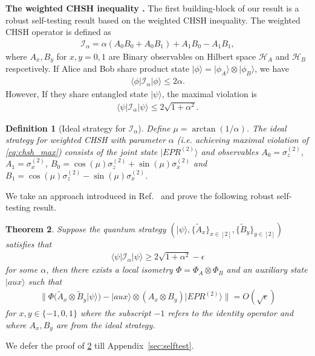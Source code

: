 \documentclass[11pt,letterpaper]{article}
\newcommand{\ket}[1]{|#1\rangle}
\newcommand{\bra}[1]{\langle#1|}
\newcommand{\x}{\otimes}
\newcommand{\calH}{\mathcal{H}}
\newcommand{\1}{\mathbb{1}}
\newcommand{\EPR}[1]{EPR^{(#1)}}
\newcommand{\paulix}[1]{\sigma_x^{(#1)}}
\newcommand{\pauliz}[1]{\sigma_z^{(#1)}}
\newcommand{\I}{\mathcal{I}}
\newtheorem{theorem}{Theorem}
\newtheorem{definition}[theorem]{Definition}
\theoremstyle{definition}
\begin{document}
\textbf{The weighted CHSH inequality \cite{acin2012}.}
The first building-block of our result is a robust self-testing result based on the weighted CHSH inequality.
The weighted CHSH operator is defined as 
\begin{align}
	\label{eq:chsh_op}
	\I_\alpha = \alpha(A_0B_0+A_0B_1) + A_1B_0 - A_1B_1,
\end{align}
where $A_x,B_y$ for $x,y = 0,1$ are Binary observables on Hilbert space $\calH_A$ and $\calH_B$ respcetively.
If Alice and Bob share product state $\ket{\phi} = \ket{\phi_A} \x \ket{\phi_B}$, we have 
\begin{align}
	\bra{\phi} \I_\alpha \ket{\phi} \leq 2\alpha.
\end{align}
However, If they share entangled state $\ket{\psi}$, the maximal violation is 
\begin{align}
\label{eq:chsh_max}
\bra{\psi} \I_\alpha \ket{\psi} \leq 2\sqrt{1+\alpha^2}.
\end{align}
\begin{definition}[Ideal strategy for $\I_\alpha$]
	Define $\mu = \arctan(1/\alpha)$.
	The ideal strategy for weighted CHSH with parameter $\alpha$ (i.e. achieving maximal violation of \cref{eq:chsh_max})
	consists of the joint state $\ket{\EPR{2}}$ and observables $A_0 = \pauliz{2}$, $A_1 = \paulix{2}$,
	$B_0 = \cos(\mu) \pauliz{2} + \sin(\mu) \paulix{2}$ and $B_1 = \cos(\mu) \pauliz{2} - \sin(\mu) \paulix{2}$.
\end{definition}
We take an approach introduced in Ref.~\cite{bamps2015} and prove the following robust self-testing result.
\begin{theorem}
\label{thm:selftest}
	Suppose the quantum strategy $(\ket{\psi}, \{\tilde{A}_x\}_{x \in [2]}, \{\tilde{B}_y\}_{y \in [2]})$ satisfies that
	\begin{align}
		\bra{\psi} \I_\alpha \ket{\psi} \geq 2\sqrt{1+\alpha^2} - \epsilon
	\end{align}
	for some $\alpha$, then
	there exists a local isometry $\Phi = \Phi_A \x \Phi_B$ and an auxiliary state $\ket{aux}$  such that
	\begin{align}
		\| \Phi( \tilde{A}_x \x \tilde{B}_y \ket{\psi}) -\ket{aux} \x (A_x \x B_y) \ket{\EPR{2}}  \| = O(\sqrt{\epsilon})
	\end{align}
	for $x,y \in \{-1, 0, 1\}$ where the subscript $-1$ refers to the identity operator and where $A_x, B_y$ are from the 
	ideal strategy.
\end{theorem}
We defer the proof of \cref{thm:selftest} till Appendix~\ref{sec:selftest}.
\end{document}

